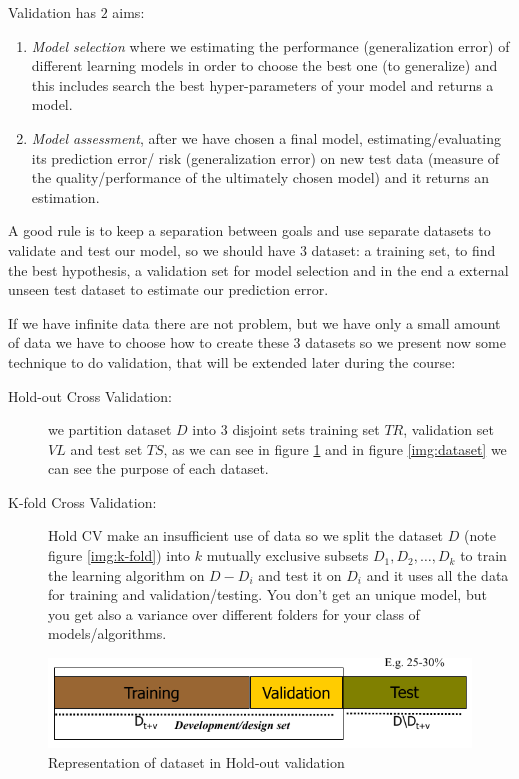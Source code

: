 Validation has $2$ aims:
	 \begin{enumerate}
	    \item \emph{Model selection} where we estimating the performance (generalization error)
		  of different learning models in order to choose the best one (to generalize) and 
		  this includes search the best hyper-parameters of your model and returns a model.
	    \item \emph{Model assessment}, after we have chosen a final model,
		  estimating/evaluating its prediction error/ risk (generalization error)
		  on new test data (measure of the quality/performance of the ultimately chosen model)
		  and it returns an estimation.
	 \end{enumerate}
	 A good rule is to keep a separation between goals and use separate datasets to validate
	 and test our model, so we should have $3$ dataset: a training set, to find the best 
	 hypothesis, a validation set for model selection and in the end a external unseen 
	 test dataset to estimate our prediction error.
	    
	 If we have infinite data there are not problem, but we have only a small amount of data
	 we have to choose how to create these $3$ datasets so we present now some technique
	 to do validation, that will be extended later during the course:
	 \begin{description}
	     \item [Hold-out Cross Validation: ] we partition dataset $D$ into $3$ disjoint sets
		    training set $TR$, validation set $VL$ and test set $TS$, as we can see
		    in figure \ref{img:hold-out} and in figure \ref{img:dataset} we can see
		    the purpose of each dataset.
	     
	    \item [K-fold Cross Validation: ] Hold CV make an insufficient use of data so we 
		  split the dataset $D$ (note figure \ref{img:k-fold}) into $k$ mutually exclusive subsets $D_1, D_2, \dots, D_k$
		  to train the learning algorithm on $D - D_i$ and test it on $D_i$ and it uses
		  all the data for training and validation/testing.
		  You don't get an unique model, but you get also a variance over different folders for your class of models/algorithms.
	\end{description}

	\begin{figure}
	    \caption{Representation of dataset in Hold-out validation}
	    \label{img:hold-out}
	    \includegraphics[width=\textwidth]{images/holdOut}
	\end{figure}
	
